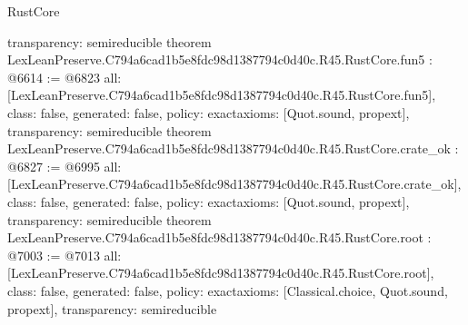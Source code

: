 \begin{lexlean}{RustCore}
\begin{coremodule}
{  transparency: semireducible
}
theorem LexLeanPreserve.C794a6cad1b5e8fdc98d1387794c0d40c.R45.RustCore.fun5 : @6614 := @6823 {
  all: [LexLeanPreserve.C794a6cad1b5e8fdc98d1387794c0d40c.R45.RustCore.fun5],
  class: false,
  generated: false,
  policy: exact{axioms: [Quot.sound, propext]},
  transparency: semireducible
}
theorem LexLeanPreserve.C794a6cad1b5e8fdc98d1387794c0d40c.R45.RustCore.crate_ok : @6827 := @6995 {
  all: [LexLeanPreserve.C794a6cad1b5e8fdc98d1387794c0d40c.R45.RustCore.crate_ok],
  class: false,
  generated: false,
  policy: exact{axioms: [Quot.sound, propext]},
  transparency: semireducible
}
theorem LexLeanPreserve.C794a6cad1b5e8fdc98d1387794c0d40c.R45.RustCore.root : @7003 := @7013 {
  all: [LexLeanPreserve.C794a6cad1b5e8fdc98d1387794c0d40c.R45.RustCore.root],
  class: false,
  generated: false,
  policy: exact{axioms: [Classical.choice, Quot.sound, propext]},
  transparency: semireducible
}


\end{coremodule}
\end{lexlean}
